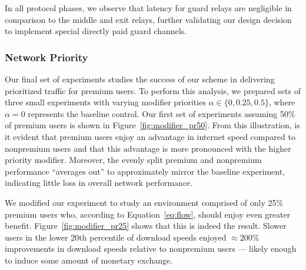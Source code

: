 In all protocol phases, we observe that latency for guard relays are negligible
in comparison to the middle and exit relays, further validating our design
decision to implement special directly paid guard channels.

\subsubsection{Network Priority}
\label{sec:priority_exp}

Our final set of experiments studies the success of our scheme in delivering
prioritized traffic for premium users. To perform this analysis, we prepared
sets of three small experiments with varying modifier priorities
$\alpha \in \{0, 0.25, 0.5\}$, where $\alpha = 0$ represents the baseline
control. Our first set of experiments assuming 50\% of premium users is shown in
Figure~\ref{fig:modifier_pr50}. From this illustration, is it evident that
premium users enjoy an advantage in internet speed compared to nonpremium users
and that this advantage is more pronounced with the higher priority
modifier. Moreover, the evenly split premium and nonpremium performance
``averages out'' to approximately mirror the baseline experiment, indicating
little loss in overall network performance.

We modified our experiment to study an environment comprised of only 25\%
premium users who, according to Equation~\ref{eq:flow}, should enjoy even
greater benefit. Figure~\ref{fig:modifier_pr25} shows that this is indeed the
result. Slower users in the lower 20th percentile of download speeds enjoyed
$\approx 200\%$ improvements in download speeds relative to nonpremium users ---
likely enough to induce some amount of monetary exchange.

